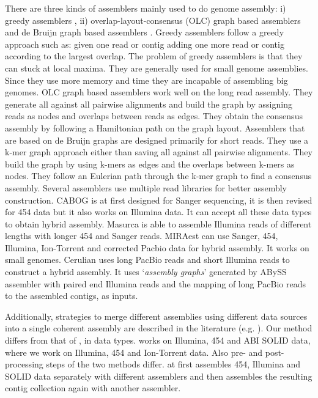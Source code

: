 \documentclass{llncs}
\begin{document}
There are three kinds of assemblers mainly used to do genome assembly: i) greedy assemblers \cite{ssake:2007,sharcgs:2007,vcake:2007}, ii) overlap-layout-consensus (OLC) graph based assemblers \cite{celera:2000, sga:2012, hapsemblerDonmez:2011} and de Bruijn graph based assemblers \cite{eulerPevzner:2008, abyssSimpson:2009, velvetZerbino:2008, spadesBankevich:2012, allpaths:2008}. Greedy assemblers follow a greedy approach such as: given one read or contig adding one more read or contig according to the largest overlap. The problem of greedy assemblers is that they can stuck at local maxima. They are generally used for small genome assemblies. Since they use more memory and time they are incapable of assembling big genomes. 
OLC graph based assemblers work well on the long read assembly. They generate all against all pairwise alignments and build the graph by assigning reads as nodes and overlaps between reads as edges. 
They obtain the consensus assembly by following a Hamiltonian path on the graph layout. 
Assemblers that are based on de Bruijn graphs are designed primarily for short reads. 
They use a k-mer graph approach either than saving all against all pairwise alignments. They build the graph by using k-mers as edges and the overlaps between k-mers as nodes. They follow an Eulerian path through the k-mer graph to find a consensus assembly.
Several assemblers use multiple read libraries \cite{cabogMiller:2008, masurcaZimin:2013, miraest, cerulian:2013} for better assembly construction. CABOG \cite{cabogMiller:2008} is at first designed for Sanger sequencing, it is then revised for 454 data but it also works on Illumina data. It can accept all these data types to obtain hybrid assembly. Masurca \cite{masurcaZimin:2013} is able to assemble Illumina reads of different lengths with longer 454 and Sanger reads. MIRAest \cite{miraest} can use Sanger, 454, Illumina, Ion-Torrent and corrected Pacbio data for hybrid assembly. It works on small genomes. Cerulian \cite{cerulian:2013} uses long PacBio reads and short Illumina reads to construct a hybrid assembly. It uses `\textit{assembly graphs}' generated by ABySS \cite{abyssSimpson:2009} assembler with paired end Illumina reads and the mapping of long PacBio reads to the assembled contigs, as inputs.

Additionally, strategies to merge different assemblies using different data sources into a single coherent assembly are described in the literature (e.g. \cite{wang:2012}). Our method differs from that of \cite{wang:2012}, in data types. \cite{wang:2012} works on Illumina, 454 and ABI SOLID data, where we work on Illumina, 454 and Ion-Torrent data. Also pre- and post-processing steps of the two methods differ. \cite{wang:2012} at first assembles 454, Illumina and SOLID data separately with different assemblers and then assembles the resulting contig collection again with another assembler.
\end{document}
